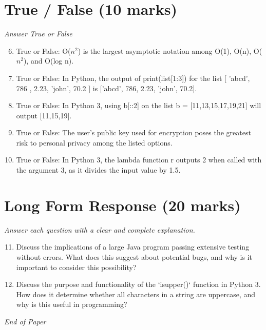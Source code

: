 \documentclass[12pt]{article}
\begin{document}
\section*{True / False (10 marks)}
\textit{Answer True or False}
\begin{enumerate}[label=\arabic*.]
\setcounter{enumi}{5}
\item True or False: O($n^2$) is the largest asymptotic notation among O(1), O(n), O($n^2$), and O(log n).
\item True or False: In Python, the output of print(list[1:3]) for the list [ 'abcd', 786 , 2.23, 'john', 70.2 ] is ['abcd', 786, 2.23, 'john', 70.2].
\item True or False: In Python 3, using b[::2] on the list b = [11,13,15,17,19,21] will output [11,15,19].
\item True or False: The user's public key used for encryption poses the greatest risk to personal privacy among the listed options.
\item True or False: In Python 3, the lambda function r outputs 2 when called with the argument 3, as it divides the input value by 1.5.
\end{enumerate}

\section*{Long Form Response (20 marks)}
\textit{Answer each question with a clear and complete explanation.}
\begin{enumerate}[label=\arabic*.]
\setcounter{enumi}{10}
\item Discuss the implications of a large Java program passing extensive testing without errors. What does this suggest about potential bugs, and why is it important to consider this possibility?
\item Discuss the purpose and functionality of the `isupper()` function in Python 3. How does it determine whether all characters in a string are uppercase, and why is this useful in programming?
\end{enumerate}

\vfill
\noindent\textit{End of Paper}
\end{document}
